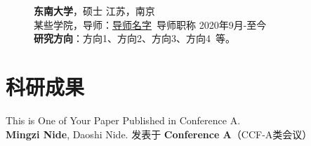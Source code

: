 \documentclass[11pt]{article}
\begin{document}
\begin{figure}[h]
\begin{minipage}[t]{0.78\textwidth}
            \vspace{0.5em}
            {\large \textbf{东南大学}}，硕士 \hfill {江苏，南京} \\
            {{某些学院}}，导师：\href{导师的个人主页.site}{导师名字}\ 导师职称 \hfill {2020年9月-至今} \\
            \textbf{研究方向}：方向1、方向2、方向3、方向4\ 等。
        \end{minipage}
        \hfill
        \begin{minipage}[t]{0.2\textwidth}
            \vspace{2em}
            \setlength{\fboxsep}{0pt}
        \end{minipage}
    \end{figure}
    \vspace{-1em}

    \section{\makebox[\widthof{\faGraduationCap}][c]{\color{primary_color}{\faGraduationCap}}\quad 科研成果}

    This is One of Your Paper Published in Conference A. \\
    \textbf{Mingzi Nide}, Daoshi Nide. \hfill 
    发表于 \textbf{Conference A}（CCF-A类会议） 
\end{document}
